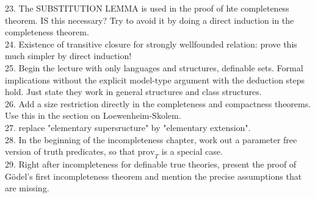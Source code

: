 \documentclass[a4paper, 11pt]{amsart}
\theoremstyle{remark}
\newcommand{\prov}{\mathrm{prov}}
\begin{document}
{23. The SUBSTITUTION LEMMA is used in the proof of hte completeness theorem. IS this necessary? Try to avoid it by doing a direct induction in the completeness theorem. \\ 
24. Existence of transitive closure for strongly wellfounded relation: prove this much simpler by direct induction! \\ 
25. Begin the lecture with only languages and structures, definable sets. Formal implications without the explicit model-type argument with the deduction steps hold. Just state they work in general structures and class structures. \\ 
26. Add a size restriction directly in the completeness and compactness theorems. Use this in the section on Loewenheim-Skolem. \\ 
27. replace "elementary supersructure" by "elementary extension".\\ 
28. In the beginning of the incompleteness chapter, work out a parameter free version of truth predicates, so that $\prov_T$ is a special case. \\ 
29. Right after incompleteness for definable true theories, present the proof of G\"odel's first incompleteness theorem and mention the precise assumptions that are missing. 
} 





\fi 






\end{document}

